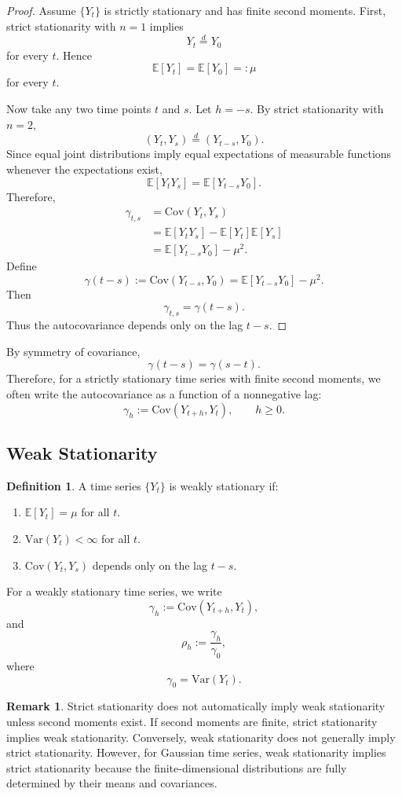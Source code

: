\documentclass[12pt,oneside]{book}
\numberwithin{equation}{section}
\theoremstyle{definition}
\newtheorem{definition}{Definition}[section]
\newtheorem{remark}{Remark}[section]
\theoremstyle{plain}
\theoremstyle{remark}
\newcommand{\E}{\mathbb{E}}
\newcommand{\Var}{\mathrm{Var}}
\newcommand{\Cov}{\mathrm{Cov}}
\begin{document}
\begin{proof}
Assume $\{Y_t\}$ is strictly stationary and has finite second moments. First, strict stationarity with $n=1$ implies
\[
Y_t \overset{d}{=} Y_0
\]
for every $t$. Hence
\[
\E[Y_t]=\E[Y_0]=:\mu
\]
for every $t$.

Now take any two time points $t$ and $s$. Let $h=-s$. By strict stationarity with $n=2$,
\[
(Y_t,Y_s)
\overset{d}{=}
(Y_{t-s},Y_0).
\]
Since equal joint distributions imply equal expectations of measurable functions whenever the expectations exist,
\[
\E[Y_tY_s]
=
\E[Y_{t-s}Y_0].
\]
Therefore,
\begin{align*}
\gamma_{t,s}
&=
\Cov(Y_t,Y_s) \\
&=
\E[Y_tY_s]-\E[Y_t]\E[Y_s] \\
&=
\E[Y_{t-s}Y_0]-\mu^2.
\end{align*}
Define
\[
\gamma(t-s)
:=
\Cov(Y_{t-s},Y_0)
=
\E[Y_{t-s}Y_0]-\mu^2.
\]
Then
\[
\gamma_{t,s}=\gamma(t-s).
\]
Thus the autocovariance depends only on the lag $t-s$.
\end{proof}

By symmetry of covariance,
\[
\gamma(t-s)=\gamma(s-t).
\]
Therefore, for a strictly stationary time series with finite second moments, we often write the autocovariance as a function of a nonnegative lag:
\[
\gamma_h := \Cov(Y_{t+h},Y_t),
\qquad h\geq 0.
\]

\subsection*{Weak Stationarity}

\begin{definition}
A time series $\{Y_t\}$ is weakly stationary if:
\begin{enumerate}
\item $\E[Y_t]=\mu$ for all $t$.
\item $\Var(Y_t)<\infty$ for all $t$.
\item $\Cov(Y_t,Y_s)$ depends only on the lag $t-s$.
\end{enumerate}
\end{definition}

For a weakly stationary time series, we write
\[
\gamma_h
:=
\Cov(Y_{t+h},Y_t),
\]
and
\[
\rho_h
:=
\frac{\gamma_h}{\gamma_0},
\]
where
\[
\gamma_0=\Var(Y_t).
\]

\begin{remark}
Strict stationarity does not automatically imply weak stationarity unless second moments exist. If second moments are finite, strict stationarity implies weak stationarity. Conversely, weak stationarity does not generally imply strict stationarity. However, for Gaussian time series, weak stationarity implies strict stationarity because the finite-dimensional distributions are fully determined by their means and covariances.
\end{remark}
\end{document}
